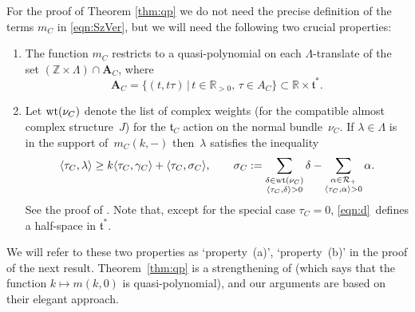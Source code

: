 \documentclass[11pt]{article}
\numberwithin{equation}{section}
\newcommand{\pair}[2]{\langle #1, #2 \rangle}
\newcommand{\tn}[1]{\textnormal{#1}}
\def\t{\ensuremath{\mathfrak{t}}}
\def\R{\ensuremath{\mathcal{R}}}
\def\bR{\ensuremath{\mathbb{R}}}
\def\bZ{\ensuremath{\mathbb{Z}}}
\begin{document}
For the proof of Theorem \ref{thm:qp} we do not need the precise definition of the terms $m_C$ in \eqref{eqn:SzVer}, but we will need the following two crucial properties:
\begin{enumerate}\itemsep=0pt
\item The function $m_C$ restricts to a quasi-polynomial on each $\Lambda$-translate of the set $(\bZ\times \Lambda)\cap \bm{A}_C$, where
\[ \bm{A}_C=\{(t,t\tau)\,|\,t\in \bR_{>0}, \,\tau \in A_C\} \subset \bR \times \t^\ast.\]
\item Let $\tn{wt}(\nu_C)$ denote the list of complex weights (for the compatible almost complex structure~$J$) for the $\t_C$ action on the normal bundle~$\nu_C$. If $\lambda \in \Lambda$ is in the support of~$m_C(k,-)$ then~$\lambda$ satisfies the inequality
\begin{gather}\label{eqn:d}
\pair{\tau_C}{\lambda}\ge k\pair{\tau_C}{\gamma_C}+\pair{\tau_C}{\sigma_C}, \qquad \sigma_C:=\sum_{\substack{\delta \in \tn{wt}(\nu_C)\\ \pair{\tau_C}{\delta}>0}} \delta-\sum_{\substack{\alpha \in \R_+ \\ \pair{\tau_C}{\alpha}>0}}\alpha.
\end{gather}
See the proof of \cite[Theorem~49]{SzenesVergne2010}. Note that, except for the special case $\tau_C=0$, \eqref{eqn:d}~defines a half-space in $\t^\ast$.
\end{enumerate}
We will refer to these two properties as `property~(a)', `property~(b)' in the proof of the next result. Theorem~\ref{thm:qp} is a strengthening of \cite[Theorem~49]{SzenesVergne2010} (which says that the function $k \mapsto m(k,0)$ is quasi-polynomial), and our arguments are based on their elegant approach.
\end{document}
